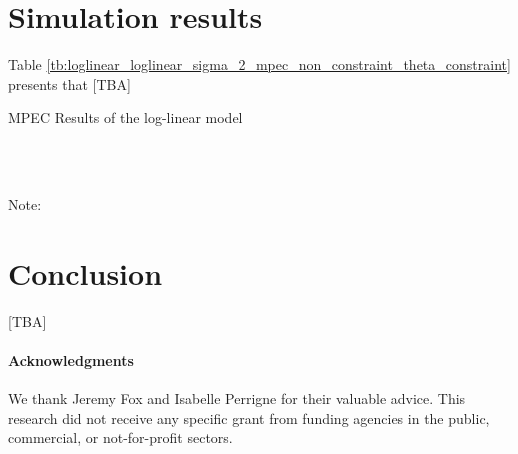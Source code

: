 \documentclass[11pt, a4paper]{article}
\begin{document}

\section{Simulation results}\label{sec:results}

Table \ref{tb:loglinear_loglinear_sigma_2_mpec_non_constraint_theta_constraint} presents that [TBA]


\begin{table}[!htbp]
  \begin{center}
      \caption{MPEC Results of the log-linear model}
      \label{tb:loglinear_loglinear_sigma_2_mpec_non_constraint_theta_constraint} 
      \subfloat[$\sigma=0.001$]{}\\
      \subfloat[$\sigma=0.5$]{}\\
    \subfloat[$\sigma=2.0$]{}
  \end{center}
  \footnotesize
  Note: 
\end{table} 



\section{Conclusion}
[TBA]


\paragraph{Acknowledgments}
We thank Jeremy Fox and Isabelle Perrigne for their valuable advice. This research did not receive any specific grant from funding agencies in the public, commercial, or not-for-profit sectors. 
\end{document}
